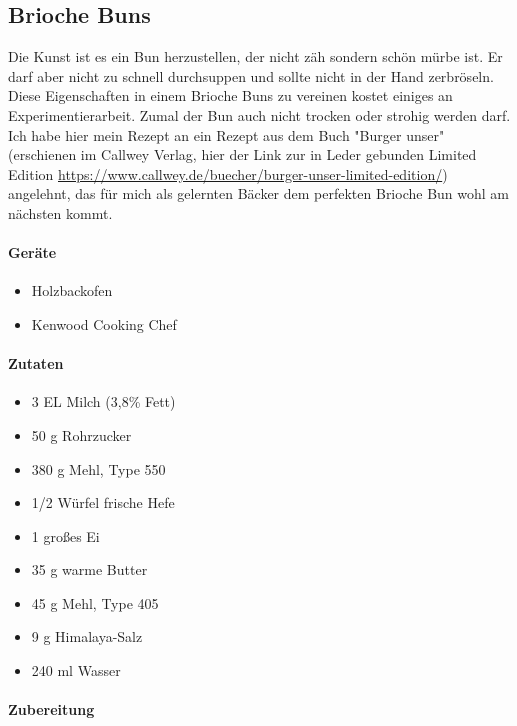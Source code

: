 \subsection{Brioche Buns}\label{BriocheBun}
Die Kunst ist es ein Bun herzustellen, der nicht zäh sondern schön mürbe ist. Er darf aber nicht zu schnell durchsuppen und sollte nicht in der 
Hand zerbröseln. Diese Eigenschaften in einem Brioche Buns zu vereinen kostet einiges an Experimentierarbeit. Zumal der Bun auch nicht 
trocken oder strohig werden darf.
Ich habe hier mein Rezept an ein Rezept aus dem Buch "Burger unser" (erschienen im Callwey Verlag, hier der Link zur in Leder gebunden Limited Edition \url{https://www.callwey.de/buecher/burger-unser-limited-edition/}) angelehnt, das für mich als gelernten Bäcker dem perfekten Brioche Bun  wohl am nächsten kommt.

\paragraph{Geräte}

\begin{itemize}[noitemsep]
	\item Holzbackofen
	\item Kenwood Cooking Chef
\end{itemize}

\paragraph{Zutaten}

\begin{itemize}[noitemsep]
	\item 3 EL Milch (3,8\% Fett)
	\item 50 g Rohrzucker
	\item 380 g Mehl, Type 550
	\item 1/2 Würfel frische Hefe
	\item 1 großes Ei
	\item 35 g warme Butter
	\item 45 g Mehl, Type 405
	\item 9 g Himalaya-Salz
	\item 240 ml Wasser
\end{itemize}

\paragraph{Zubereitung}

